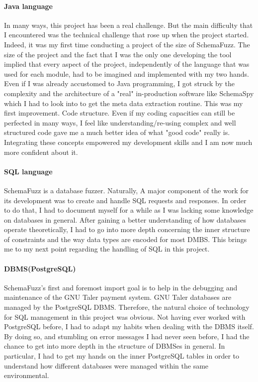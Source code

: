 		\paragraph{Java language}
In many ways, this project has been a real challenge. But the main difficulty that I encountered was the technical challenge that rose up when the project started. Indeed, it was my first time conducting a project of the size of SchemaFuzz. The size of the project and the fact that I was the only one developing the tool implied that every aspect of the project, independently of the language that was used for each module, had to be imagined and implemented with my two hands.
Even if I was already accustomed to Java programming, I got struck by the complexity and the architecture of a "real" in-production software like SchemaSpy which I had to look into to get the meta data extraction routine.
This was my first improvement. Code structure. Even if my coding capacities can still be perfected in many ways, I feel like understanding/re-using complex and well structured code gave me a much better idea of what "good code" really is. Integrating these concepts empowered my development skills and I am now much more confident about it.

			\paragraph{SQL language}
SchemaFuzz is a database fuzzer. Naturally, A major component of the work for its development was to create and handle SQL requests and responses. In order to do that, I had to document myself for a while as I was lacking some knowledge on databases in general. After gaining a better understanding of how databases operate theoretically, I had to go into more depth concerning the inner structure of constraints and the way data types are encoded for most DMBS.
This brings me to my next point regarding the handling of SQL in this project.

			\paragraph{DBMS(PostgreSQL)} 
SchemaFuzz's first and foremost import goal is to help in the debugging and maintenance of the GNU Taler payment system. GNU Taler databases are managed by the PostgreSQL DBMS. Therefore, the natural choice of technology for SQL management in this project was obvious.
Not having ever worked with PostgreSQL before, I had to adapt my habits when dealing with the DBMS itself.
By doing so, and stumbling on error messages I had never seen before, I had the chance to get into more depth in the structure of DBMSes in general. In particular, I had to get my hands on the inner PostgreSQL tables in order to understand how different databases were managed within the same environmental.


